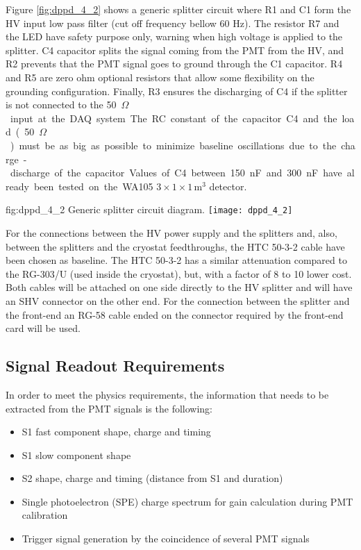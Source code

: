 Figure \ref{fig:dppd_4_2} shows a generic splitter circuit where R1 and C1 form the HV input low pass filter (cut off frequency bellow 60 Hz). The resistor R7 and the LED have safety purpose only, warning when high voltage is applied to the splitter. C4 capacitor splits the signal coming from the PMT from the HV, and R2 prevents that the PMT signal goes to ground through the C1 capacitor. R4 and R5 are zero ohm optional resistors that allow some flexibility on the grounding configuration. Finally, R3 ensures the discharging of C4 if the splitter is not connected to the \SI{50}{$\Omega$} input at the DAQ system. The RC constant of the capacitor C4 and the load (\SI{50}{$\Omega$}) must be as big as possible to minimize baseline oscillations due to the charge-discharge of the capacitor. Values of C4 between \SI{150}{nF} and \SI{300}{nF} have already been tested on the WA105 $3\times1\times1$\,m$^3$ detector.

\begin{dunefigure}{fig:dppd_4_2}
{Generic splitter circuit diagram.}
\texttt{[image: dppd\_4\_2]}
\end{dunefigure}

For the connections between the HV power supply and the splitters and, also, between the splitters and the cryostat feedthroughs, the HTC 50-3-2 cable have been chosen as baseline. The HTC 50-3-2 has a similar attenuation compared to the RG-303/U (used inside the cryostat), but, with a factor of 8 to 10 lower cost. Both cables will be attached on one side directly to the HV splitter and will have an SHV connector on the other end. For the connection between the splitter and the front-end an RG-58 cable ended on the connector required by the front-end card will be used.

\subsection{Signal Readout Requirements}
\label{sec:fddp-pd-4.3}

In order to meet the physics requirements, the information that needs to be extracted from the PMT signals is the following:

\begin{itemize}
\item S1 fast component shape, charge and timing
\item S1 slow component shape
\item S2 shape, charge and timing (distance from S1 and duration)
\item Single photoelectron (SPE) charge spectrum for gain calculation during PMT calibration
\item Trigger signal generation by the coincidence of several PMT signals
\end{itemize}

